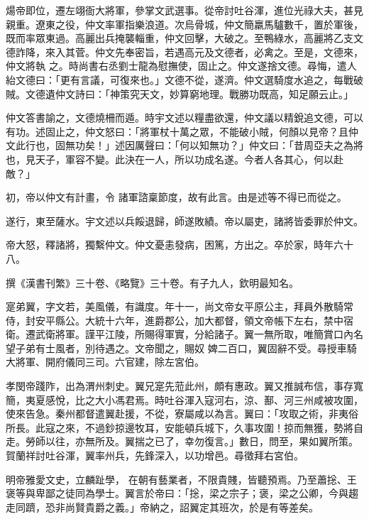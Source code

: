 \begin{pinyinscope}
 煬帝即位，遷左翊衙大將軍，參掌文武選事。從帝討吐谷渾，進位光祿大夫，甚見親重。遼東之役，仲文率軍指樂浪道。次烏骨城，仲文簡羸馬驢數千，置於軍後，既而率眾東過。高麗出兵掩襲輜重，仲文回擊，大破之。至鴨綠水，高麗將乙支文德詐降，來入其菅。仲文先奉密旨，若遇高元及文德者，必禽之。至是，文德來，仲文將執
 之。時尚書右丞劉士龍為慰撫使，固止之。仲文遂捨文德。尋悔，遣人紿文德曰：「更有言議，可復來也。」文德不從，遂濟。仲文選騎度水追之，每戰破賊。文德遺仲文詩曰：「神策究天文，妙算窮地理。戰勝功既高，知足願云止。」



 仲文答書諭之，文德燒柵而遁。時宇文述以糧盡欲還，仲文議以精銳追文德，可以有功。述固止之，仲文怒曰：「將軍杖十萬之眾，不能破小賊，何顏以見帝？且仲文此行也，固無功矣！」述因厲聲曰：「何以知無功？」仲文曰：「昔周亞夫之為將也，見天子，軍容不變。此決在一人，所以功成名遂。今者人各其心，何以赴敵？」



 初，帝以仲文有計畫，令
 諸軍諮稟節度，故有此言。由是述等不得已而從之。



 遂行，東至薩水。宇文述以兵餒退歸，師遂敗績。帝以屬吏，諸將皆委罪於仲文。



 帝大怒，釋諸將，獨繫仲文。仲文憂恚發病，困篤，方出之。卒於家，時年六十八。



 撰《漢書刊繁》三十卷、《略覽》三十卷。有子九人，欽明最知名。



 寔弟翼，字文若，美風儀，有識度。年十一，尚文帝女平原公主，拜員外散騎常侍，封安平縣公。大統十六年，進爵郡公，加大都督，領文帝帳下左右，禁中宿衛。遷武衛將軍。謹平江陵，所賜得軍實，分給諸子。翼一無所取，唯簡賞口內名望子弟有士風者，別待遇之。文帝聞之，賜奴
 婢二百口，翼固辭不受。尋授車騎大將軍、開府儀同三司。六官建，除左宮伯。



 孝閔帝踐阼，出為渭州刺史。翼兄寔先蒞此州，頗有惠政。翼又推誠布信，事存寬簡，夷夏感悅，比之大小馮君焉。時吐谷渾入寇河右，涼、鄯、河三州咸被攻圍，使來告急。秦州都督遣翼赴援，不從，寮屬咸以為言。翼曰：「攻取之術，非夷俗所長。此寇之來，不過鈔掠邊牧耳，安能頓兵城下，久事攻圍！掠而無獲，勢將自走。勞師以往，亦無所及。翼揣之已了，幸勿復言。」數日，問至，果如翼所策。賀蘭祥討吐谷渾，翼率州兵，先鋒深入，以功增邑。尋徵拜右宮伯。



 明帝雅愛文史，立麟趾學，
 在朝有藝業者，不限貴賤，皆聽預焉。乃至蕭捴、王褒等與卑鄙之徒同為學士。翼言於帝曰：「捴，梁之宗子；褒，梁之公卿，今與趨走同躋，恐非尚賢貴爵之義。」帝納之，詔翼定其班次，於是有等差矣。




\end{pinyinscope}
